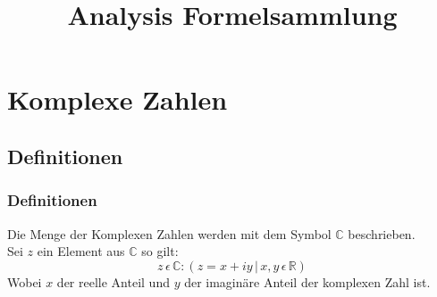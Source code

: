 \documentclass[a4paper]{scrartcl}
\author{}
\title{Analysis Formelsammlung}
\begin{document}
    \maketitle
    \afterpage{\null\newpage}
    \newpage
    
    \tableofcontents
    \newpage
    
    \section{Komplexe Zahlen}
        \subsection{Definitionen}
            \subsubsection{Definitionen}
                Die Menge der Komplexen Zahlen werden mit dem Symbol \(\mathbb{C}\) beschrieben.\\
                Sei \(z\) ein Element aus \(\mathbb{C}\) so gilt:
                \begin{equation}
                    z \, \epsilon \, \mathbb{C} : (z = x + iy \,|\, x,y \,\epsilon \, \mathbb{R})
                \end{equation}
                Wobei \(x\) der reelle Anteil und \(y\) der imaginäre Anteil der komplexen Zahl ist. 
            
\end{document}

